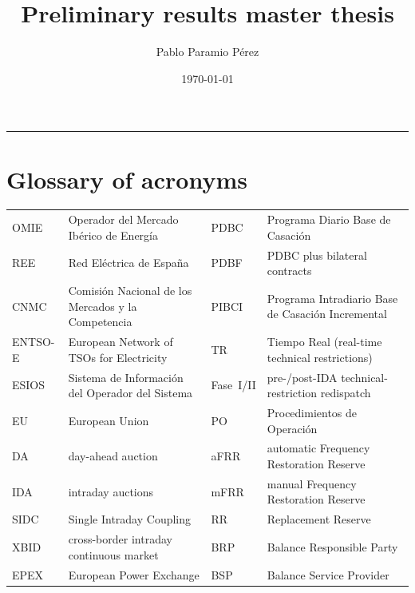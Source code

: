 \documentclass[11pt]{article}
\title{Preliminary results master thesis}
\author{\normalsize Pablo Paramio P\'erez}
\date{\normalsize\today}
\begin{document}
\maketitle
\vspace{-0.8cm}

{\hypersetup{linkcolor=black}\tableofcontents}
\vspace{6pt}
\hrule
\vspace{6pt}

\section*{Glossary of acronyms}
\label{sec:glossary}

\noindent\footnotesize
\begin{tabular}{@{}l p{}@{\hspace{1em}}l p{}@{}}
\toprule
OMIE      & Operador del Mercado Ib\'erico de Energ\'ia  & PDBC     & Programa Diario Base de Casaci\'on \\
REE       & Red El\'ectrica de Espa\~na                  & PDBF     & PDBC plus bilateral contracts \\
CNMC      & Comisi\'on Nacional de los Mercados y la Competencia & PIBCI & Programa Intradiario Base de Casaci\'on Incremental \\
ENTSO-E   & European Network of TSOs for Electricity     & TR       & Tiempo Real (real-time technical restrictions) \\
ESIOS     & Sistema de Informaci\'on del Operador del Sistema & Fase~I/II & pre-/post-IDA technical-restriction redispatch \\
EU        & European Union                                & PO       & Procedimientos de Operaci\'on \\
DA        & day-ahead auction                             & aFRR     & automatic Frequency Restoration Reserve \\
IDA       & intraday auctions                             & mFRR     & manual Frequency Restoration Reserve \\
SIDC      & Single Intraday Coupling                      & RR       & Replacement Reserve \\
XBID      & cross-border intraday continuous market       & BRP      & Balance Responsible Party \\
EPEX      & European Power Exchange                       & BSP      & Balance Service Provider \\

\end{tabular}
\end{document}
